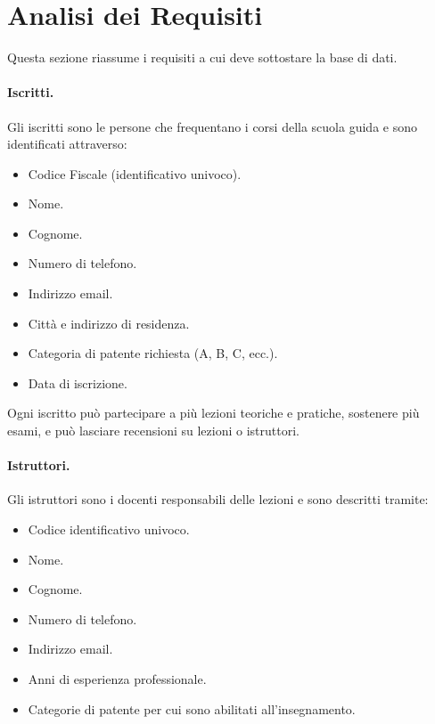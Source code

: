 \documentclass[10pt,twoside]{article}
\begin{document}
\section{Analisi dei Requisiti}{
    Questa sezione riassume i requisiti a cui deve sottostare la base di dati.

    \paragraph{Iscritti.}
    Gli iscritti sono le persone che frequentano i corsi della scuola guida e sono identificati attraverso:

    \begin{itemize}
        \item Codice Fiscale (identificativo univoco).
        \item Nome.
        \item Cognome.
        \item Numero di telefono.
        \item Indirizzo email.
        \item Città e indirizzo di residenza.
        \item Categoria di patente richiesta (A, B, C, ecc.).
        \item Data di iscrizione.
    \end{itemize}
    
    Ogni iscritto può partecipare a più lezioni teoriche e pratiche, sostenere più esami, e può lasciare recensioni su lezioni o istruttori.
    

    \paragraph{Istruttori.}
    Gli istruttori sono i docenti responsabili delle lezioni e sono descritti tramite:
    
    \begin{itemize}
        \item Codice identificativo univoco.
        \item Nome.
        \item Cognome.
        \item Numero di telefono.
        \item Indirizzo email.
        \item Anni di esperienza professionale.
        \item Categorie di patente per cui sono abilitati all’insegnamento.
    \end{itemize}

}
\end{document}
